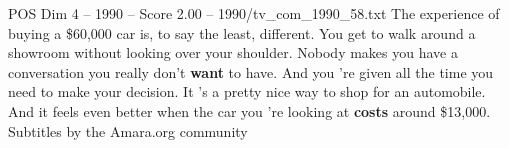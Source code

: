 \begin{textsample}{POS Dim 4 – 1990 – Score 2.00 – 1990/tv\_com\_1990\_58.txt}  \label{ex:f4_pos_021}
The experience of buying a \$60,000 car is, to say the least, different.
You get to walk around a showroom without looking over your shoulder.
Nobody makes you have a conversation you really don't \textbf{want} to have.
And you 're given all the time you need to make your decision.
It 's a pretty nice way to shop for an automobile.
And it feels even better when the car you 're looking at \textbf{costs} around \$13,000.
Subtitles by the Amara.org community

\end{textsample}
